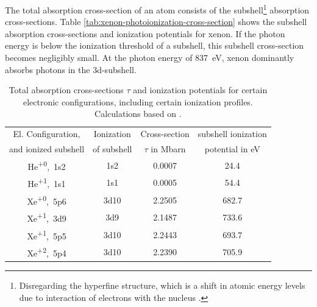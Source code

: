 The total absorption cross-section of an atom consists of the subshell\footnote{Disregarding the hyperfine structure, which is a shift in atomic energy levels due to interaction of electrons with the nucleus \citep{Demtroder-2005-Springer}.} absorption cross-sections. Table \ref{tab:xenon-photoionization-cross-section} shows the subshell absorption cross-sections and ionization potentials for xenon. If the photon energy is below the ionization threshold of a subshell, this subshell cross-section becomes negligibly small. At the photon energy of \SI{837}{\electronvolt}, xenon dominantly absorbs photons in the 3d-subshell.
\begin{table}
	\centering
		\begin{tabular}{ | c | c | c | c | }
		\hline
			El. Configuration, & Ionization & Cross-section  & subshell ionization  \\
			and ionized subshell & of subshell & $\tau$ in Mbarn & potential in eV \\ \hline
			He\textsuperscript{+0},\ 1s2 & 1s2 & 0.0007 & 24.4 \\ \hline
			He\textsuperscript{+1},\ 1s1 & 1s1 & 0.0005 & 54.4 \\ \hline
			Xe\textsuperscript{+0},\ 5p6 & 3d10 & 2.2505 & 682.7 \\ \hline
			Xe\textsuperscript{+1},\ 3d9 & 3d9 & 2.1487 & 733.6 \\ \hline
			Xe\textsuperscript{+1},\ 5p5 & 3d10 & 2.2443 & 693.7 \\ \hline
			Xe\textsuperscript{+2},\ 5p4 & 3d10 & 2.2390 & 705.9 \\ \hline
		\end{tabular}
	\caption[Absorption cross-sections and ionization potentials for xenon and helium]{Total absorption cross-sections $\tau$ and ionization potentials for certain electronic configurations, including certain ionization profiles. Calculations based on \citep{Cowan-1981-Cal}.}
	\label{tab:helium-xenon-ionization}
\end{table}
